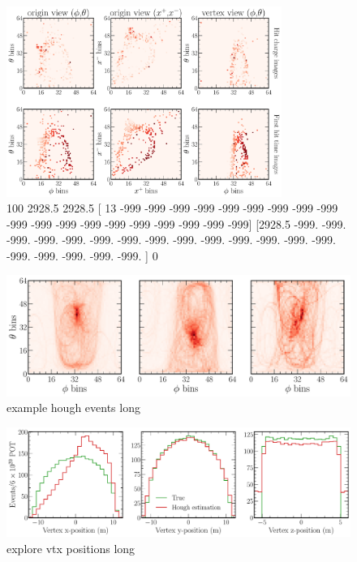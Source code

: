 \begin{figure} %
    \includegraphics[width=0.8\textwidth]{diagrams/7-cvn/chipsnet/explore_cosmic_event.pdf}
    \caption[explore cosmic event short]
    {100
        2928.5
        2928.5
            [  13 -999 -999 -999 -999 -999 -999 -999 -999 -999 -999 -999 -999 -999
                -999 -999 -999 -999 -999 -999]
            [2928.5 -999.  -999.  -999.  -999.  -999.  -999.  -999.  -999.  -999.
                -999.  -999.  -999.  -999.  -999.  -999.  -999.  -999.  -999.  -999. ]
        0}
    \label{fig:explore_cosmic_event}
\end{figure}

\begin{figure} %
    \includegraphics[width=\textwidth]{diagrams/7-cvn/chipsnet/explore_hough_events.pdf}
    \caption[example hough events short]
    {example hough events long}
    \label{fig:example_hough_events}
\end{figure}

\begin{figure} %
    \includegraphics[width=\textwidth]{diagrams/7-cvn/chipsnet/explore_vtx_positions.pdf}
    \caption[explore vtx positions short]
    {explore vtx positions long}
    \label{fig:explore_vtx_positions}
\end{figure}

